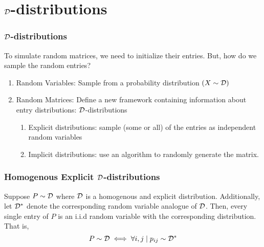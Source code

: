 

\section{$\mathcal{D}$-distributions}
\begin{frame}
\frametitle{$\mathcal{D}$-distributions}

To simulate random matrices, we need to initialize their entries. But, how do we sample the random entries?

\begin{enumerate}
  \item Random Variables: Sample from a probability distribution $(X \sim \mathcal{D})$
  \item Random Matrices: Define a new framework containing information about entry distributions: $\mathcal{D}$-distributions
    \begin{enumerate}
      \item Explicit distributions: sample (some or all) of the entries as independent random variables
      \item Implicit distributions: use an algorithm to randomly generate the matrix.
    \end{enumerate}
\end{enumerate}

\end{frame}
\begin{frame} \frametitle{Homogenous Explicit $\mathcal{D}$-distributions}

  \begin{alertblock}{}
    Suppose $P \sim \mathcal{D}$ where $\mathcal{D}$ is a homogenous and explicit distribution. Additionally, let $\mathcal{D}^*$ denote the corresponding random variable analogue of $\mathcal{D}$.
    Then, every single entry of $P$ is an i.i.d random variable with the corresponding distribution. That is,
    $$ P \sim \mathcal{D} \iff \forall i,j \mid p_{ij} \sim \mathcal{D}^* $$
  \end{alertblock}

\end{frame}
